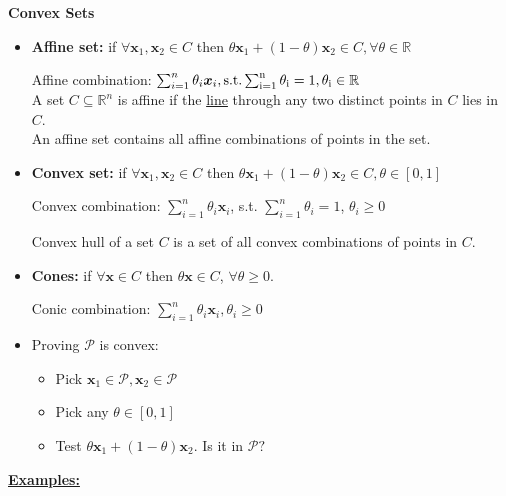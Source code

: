 {\LARGE \textbf{Convex Sets}}

\begin{itemize}

\item \textbf{Affine set:} if $\forall \bm{x}_{1}, \bm{x}_{2} \in C$ then $\theta \bm{x}_{1}+(1-\theta) \bm{x}_{2} \in C, \forall \theta \in \mathbb{R}$

 Affine combination: $\sum_{i=1}^{n} \theta_{i} \bm{x}_{i}, \rm{s.t.} \sum_{i=1}^{n} \theta_{i}=1, \theta_{i} \in \mathbb{R}$\\
{\small
A set $C \subseteq \mathbb{R}^{n}$ is affine if the \underline{line} through any two distinct points in $C$ lies in $C$.\\
An affine set contains all affine combinations of points in the set.
}

\item {\small\textbf{Convex set:} if $\forall \bm{x}_{1}, \bm{x}_{2} \in C$ then $\theta \bm{x}_{1}+(1-\theta) \bm{x}_{2} \in C, \theta \in[0,1]$}

 Convex combination: $\sum_{i=1}^{n} \theta_{i} \bm{x}_{i}$, s.t. $\sum_{i=1}^{n} \theta_{i}=1$, $\theta_{i} \geq 0$

 Convex hull of a set $C$ is a set of all convex combinations of points in $C$.

\item \textbf{Cones:} if $\forall \bm{x} \in C$ then  $\theta \bm{x} \in C$, $\forall \theta \geq 0$. 

Conic combination: $\sum_{i=1}^{n} \theta_{i} \bm{x}_{i}, \theta_{i} \geq 0$

\item Proving $\mathscr{P}$ is convex:
\begin{itemize}
    \item Pick $\bm{x}_{1} \in \mathscr{P}, \bm{x}_{2} \in \mathscr{P}$
    \item Pick any $\theta \in[0,1]$
    \item Test $\theta \bm{x}_{1}+(1-\theta) \bm{x}_{2}$. Is it in $\mathscr{P} ?$
\end{itemize}

\end{itemize}

\underline{\textbf{Examples:}}

